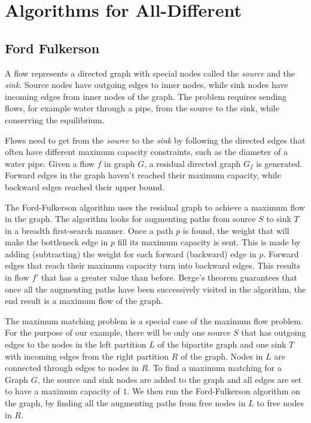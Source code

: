 \documentclass{l4proj}
\begin{document}
\chapter{Algorithms for All-Different}
\label{chap4alldiffalgos}

\section{Ford Fulkerson}
\label{ffsection}
\noindent A flow represents a directed graph with special nodes called the \textit{source} and the \textit{sink}. Source nodes have outgoing edges to inner nodes, while sink nodes have incoming edges from inner nodes of the graph. The problem requires sending flows, for example water through a pipe, from the source to the sink, while conserving the equilibrium.

\noindent Flows need to get from the \textit{source} to the \textit{sink} by following the directed edges that often have different maximum capacity constraints, such as the diameter of a water pipe. Given a flow $f$ in graph $G$, a residual directed graph $G_f$ is generated. Forward edges in the graph haven’t reached their maximum capacity, while backward edges reached their upper bound. 

\noindent The Ford-Fulkerson algorithm  \cite{ford1956maximal} uses the residual graph to achieve a maximum flow in the graph. The algorithm looks for augmenting paths from source $S$ to sink $T$ in a breadth first-search manner. Once a path $p$ is found, the weight that will make the bottleneck edge in $p$ fill its maximum capacity is sent. This is made by adding (subtracting) the weight for each forward (backward) edge in $p$. Forward edges that reach their maximum capacity turn into backward edges. This results in flow $f’$ that has a greater value than before. Berge’s theorem \cite{berge1957two} guarantees that once all the augmenting paths have been successively visited in the algorithm, the end result is a maximum flow of the graph.

\noindent The maximum matching problem is a special case of the maximum flow problem. For the purpose of our example, there will be only one source $S$ that has outgoing edges to the nodes in the left partition $L$ of the bipartite graph and one sink $T$ with incoming edges from the right partition $R$ of the graph. Nodes in $L$ are connected through edges to nodes in $R$. To find a maximum matching for a Graph $G$, the source and sink nodes are added to the graph and all edges are set to have a maximum capacity of $1$. We then run the Ford-Fulkerson algorithm \cite{ford1956maximal} on the graph, by finding all the augmenting paths from free nodes in $L$ to free nodes in $R$.
\end{document}

